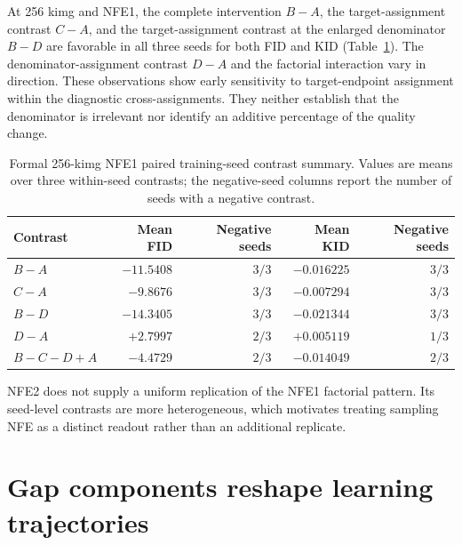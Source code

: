 \documentclass{article}
\newif\ifshowcomments
\newcommand{\claimnote}[1]{%
  \ifshowcomments{\color{claimpurple}\textbf{[CLAIM CEILING: #1]}}\fi}
\begin{document}
At 256 kimg and NFE1, the complete intervention $B-A$, the target-assignment
contrast $C-A$, and the target-assignment contrast at the enlarged denominator
$B-D$ are favorable in all three seeds for both FID and KID
(Table~\ref{tab:factorial-256}). The denominator-assignment contrast $D-A$ and the
factorial interaction vary in direction. These observations show early
sensitivity to target-endpoint assignment within the diagnostic
cross-assignments. They neither establish
that the denominator is irrelevant nor identify an additive percentage of the
quality change.

\begin{table}[t]
  \caption{Formal 256-kimg NFE1 paired training-seed contrast summary. Values
  are means over three within-seed contrasts; the negative-seed columns report
  the number of seeds with a negative contrast.}
  \label{tab:factorial-256}
  \centering
  \small
  \begin{tabular}{lrrrr}
    \toprule
    Contrast & Mean FID & Negative seeds & Mean KID & Negative seeds \\
    \midrule
    $B-A$ & $-11.5408$ & $3/3$ & $-0.016225$ & $3/3$ \\
    $C-A$ & $ -9.8676$ & $3/3$ & $-0.007294$ & $3/3$ \\
    $B-D$ & $-14.3405$ & $3/3$ & $-0.021344$ & $3/3$ \\
    $D-A$ & $ +2.7997$ & $2/3$ & $+0.005119$ & $1/3$ \\
    $B-C-D+A$ & $-4.4729$ & $2/3$ & $-0.014049$ & $2/3$ \\
    \bottomrule
  \end{tabular}
\end{table}

NFE2 does not supply a uniform replication of the NFE1 factorial pattern.
Its seed-level contrasts are more heterogeneous, which motivates treating
sampling NFE as a distinct readout rather than an additional replicate.

\claimnote{Describe the target result as directionally consistent at this
endpoint. Do not write \emph{target geometry explains X percent},
\emph{denominator does not matter}, or
\emph{the factorial endpoint validates the algebra}.}

\section{Gap components reshape learning trajectories}
\label{sec:learning-trajectories}
\end{document}
